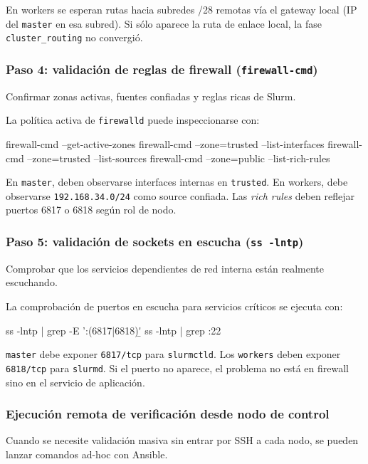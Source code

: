 En workers se esperan rutas hacia subredes /28 remotas vía el gateway local (IP del \texttt{master} en esa subred). Si sólo aparece la ruta de enlace local, la fase \texttt{cluster\_routing} no convergió.

\subsubsection{Paso 4: validación de reglas de firewall (\texttt{firewall-cmd})}
Confirmar zonas activas, fuentes confiadas y reglas ricas de Slurm.

La política activa de \texttt{firewalld} puede inspeccionarse con:

\begin{terminalblock}
firewall-cmd --get-active-zones
firewall-cmd --zone=trusted --list-interfaces
firewall-cmd --zone=trusted --list-sources
firewall-cmd --zone=public --list-rich-rules
\end{terminalblock}

En \texttt{master}, deben observarse interfaces internas en \texttt{trusted}. En workers, debe observarse \texttt{192.168.34.0/24} como source confiada. Las \textit{rich rules} deben reflejar puertos 6817 o 6818 según rol de nodo.

\subsubsection{Paso 5: validación de sockets en escucha (\texttt{ss -lntp})}
Comprobar que los servicios dependientes de red interna están realmente escuchando.

La comprobación de puertos en escucha para servicios críticos se ejecuta con:

\begin{terminalblock}
ss -lntp | grep -E ':(6817|6818)\b'
ss -lntp | grep :22
\end{terminalblock}

\texttt{master} debe exponer \texttt{6817/tcp} para \texttt{slurmctld}. Los \texttt{workers} deben exponer \texttt{6818/tcp} para \texttt{slurmd}. Si el puerto no aparece, el problema no está en firewall sino en el servicio de aplicación.

\subsubsection{Ejecución remota de verificación desde nodo de control}
Cuando se necesite validación masiva sin entrar por SSH a cada nodo, se pueden lanzar comandos ad-hoc con Ansible.

